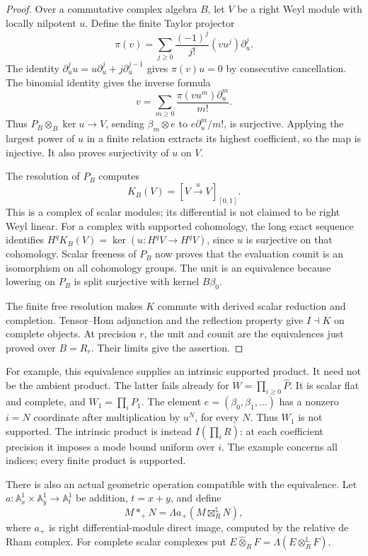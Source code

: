\begin{proof}
Over a commutative complex algebra \(B\), let \(V\) be a right Weyl
module with locally nilpotent \(u\). Define the finite Taylor projector
\[
 \pi(v)=\sum_{j\geq0}\frac{(-1)^j}{j!}(vu^j)\partial_u^j.
\]
The identity \(\partial_u^ju=u\partial_u^j+j\partial_u^{j-1}\)
gives \(\pi(v)u=0\) by consecutive cancellation.
The binomial identity gives the inverse formula
\[
                    v=\sum_{m\geq0}
                         \frac{\pi(vu^m)\partial_u^m}{m!}.
\]
Thus \(P_B\otimes_B\ker u\to V\), sending
\(\beta_m\otimes e\) to \(e\partial_u^m/m!\), is surjective.
Applying the largest power of \(u\) in a finite relation extracts
its highest coefficient, so the map is injective. It also proves
surjectivity of \(u\) on \(V\).

The resolution of \(P_B\) computes
\[
             K_B(V)=[V\xrightarrow{u}V]_{[0,1]}.
\]
This is a complex of scalar modules; its differential is not claimed
to be right Weyl linear. For a complex with supported cohomology,
the long exact sequence identifies
\(H^qK_B(V)=\ker(u:H^qV\to H^qV)\), since \(u\) is surjective
on that cohomology. Scalar freeness of \(P_B\) now proves that
the evaluation counit is an isomorphism on all cohomology groups.
The unit is an equivalence because lowering on \(P_B\) is split
surjective with kernel \(B\beta_0\).

The finite free resolution makes \(K\) commute with derived scalar
reduction and completion. Tensor--Hom adjunction and the reflection
property give \(I\dashv K\) on complete objects. At precision \(r\),
the unit and counit are the equivalences just proved over \(B=R_r\).
Their limits give the assertion.
\end{proof}

For example, this equivalence supplies an intrinsic supported product.
It need not be the ambient product. The latter fails already for
\(W=\prod_{i\geq0}\widehat P\). It is scalar flat and complete, and
\(W_1=\prod_iP_1\). The element
\(e=(\beta_0,\beta_1,\ldots)\) has a nonzero \(i=N\) coordinate
after multiplication by \(u^N\), for every \(N\). Thus \(W_1\) is
not supported. The intrinsic product is instead
\(I(\prod_iR)\): at each coefficient precision it imposes a mode bound
uniform over \(i\). The example concerns all indices; every finite
product is supported.

There is also an actual geometric operation compatible with the
equivalence. Let \(a:\mathbb A_x^1\times\mathbb A_y^1\to\mathbb A_t^1\)
be addition, \(t=x+y\), and define
\[
                   M*_+N=\Lambda a_+
                             (M\boxtimes_R^{\mathbb L}N),
\]
where \(a_+\) is right differential-module direct image, computed by
the relative de Rham complex. For complete scalar complexes put
\(E\widehat\otimes_R F=\Lambda(E\otimes_R^{\mathbb L}F)\).

